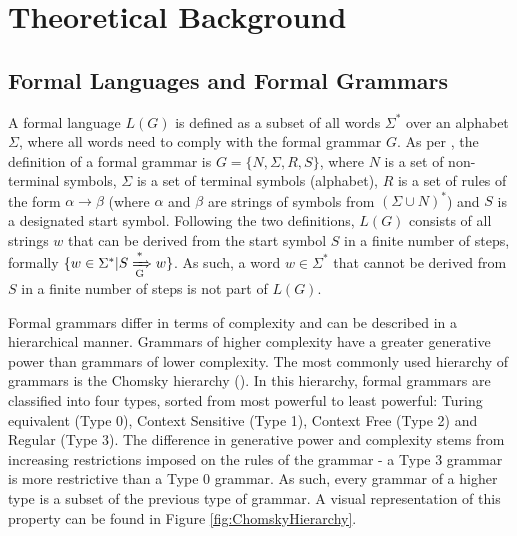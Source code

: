 \section{Theoretical Background}\label{ch:theoreticalBackground}
\subsection{Formal Languages and Formal Grammars}\label{formalLanguages}
A formal language $L(G)$ is defined as a subset of all words $\Sigma^{*}$ over an alphabet $\Sigma$, where all words need to comply with the formal grammar $G$. As per \cite{JurafskyMartin2009}, the definition of a formal grammar is $G = \lbrace N, \Sigma, R, S \rbrace$, where $N$ is a set of non-terminal symbols, $\Sigma$ is a set of terminal symbols (alphabet), $R$ is a set of rules of the form $\alpha \rightarrow \beta$ (where $\alpha$ and $\beta$ are strings of symbols from $(\Sigma \cup N)^{*}$) and $S$ is a designated start symbol. Following the two definitions, $L(G)$ consists of all strings $w$ that can be derived from the start symbol $S$ in a finite number of steps, formally $\lbrace w \in \Sigma^{*} | S \xRightarrow [\text{G}]{\text{*}} w \rbrace$. As such, a word $w \in \Sigma^{*}$ that cannot be derived from $S$ in a finite number of steps is not part of $L(G)$.

Formal grammars differ in terms of complexity and can be described in a hierarchical manner. Grammars of higher complexity have a greater generative power than grammars of lower complexity. The most commonly used hierarchy of grammars is the Chomsky hierarchy (\cite{Chomsky1959}). In this hierarchy, formal grammars are classified into four types, sorted from most powerful to least powerful: Turing equivalent (Type 0), Context Sensitive (Type 1), Context Free (Type 2) and Regular (Type 3). The difference in generative power and complexity stems from increasing restrictions imposed on the rules of the grammar - a Type 3 grammar is more restrictive than a Type 0 grammar. As such, every grammar of a higher type is a subset of the previous type of grammar. A visual representation of this property can be found in Figure \ref{fig:ChomskyHierarchy}.

